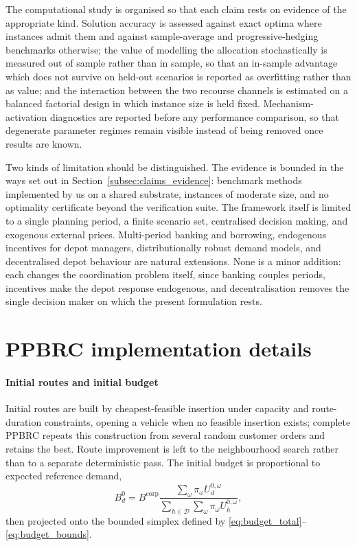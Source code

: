\documentclass[authoryear,final,3p,times]{elsarticle}
\theoremstyle{definition}
\theoremstyle{plain}
\begin{document}
The computational study is organised so that each claim rests on evidence of
the appropriate kind. Solution accuracy is assessed against exact optima
where instances admit them and against sample-average and progressive-hedging
benchmarks otherwise; the value of modelling the allocation stochastically is
measured out of sample rather than in sample, so that an in-sample advantage
which does not survive on held-out scenarios is reported as overfitting
rather than as value; and the interaction between the two recourse channels
is estimated on a balanced factorial design in which instance size is held
fixed. Mechanism-activation diagnostics are reported before any performance
comparison, so that degenerate parameter regimes remain visible instead of
being removed once results are known.

Two kinds of limitation should be distinguished. The evidence is bounded in
the ways set out in Section~\ref{subsec:claims_evidence}: benchmark methods
implemented by us on a shared substrate, instances of moderate size, and no
optimality certificate beyond the verification suite. The framework itself is
limited to a single planning period, a finite scenario set, centralised
decision making, and exogenous external prices. Multi-period
banking and borrowing, endogenous incentives for depot managers,
distributionally robust demand models, and decentralised depot behaviour are
natural extensions. None is a minor addition: each changes the coordination
problem itself, since banking couples periods, incentives make the depot
response endogenous, and decentralisation removes the single decision maker
on which the present formulation rests.
\appendix

\section{PPBRC implementation details}
\label{app:ppbrc_details}

\paragraph{Initial routes and initial budget}
Initial routes are built by cheapest-feasible insertion under capacity and route-duration constraints, opening a vehicle when no feasible insertion exists; complete PPBRC repeats this construction from several random customer orders and retains the best. Route improvement is left to the neighbourhood search rather than to a separate deterministic pass. The initial budget is proportional to expected reference demand,
\[
 B_d^0=B^{\mathrm{corp}}\frac{\sum_\omega\pi_\omega U_d^{0,\omega}}{\sum_{h\in\mathcal D}\sum_\omega\pi_\omega U_h^{0,\omega}},
\]
then projected onto the bounded simplex defined by \eqref{eq:budget_total}--\eqref{eq:budget_bounds}.
\end{document}
